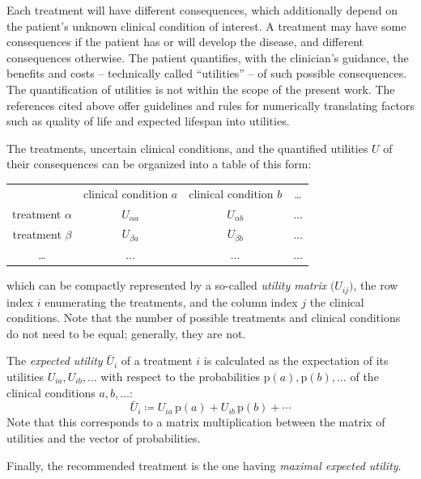 \documentclass[utf8]{FrontiersinHarvard} %
\newcommand*{\pencil}{{\fontencoding{U}\fontfamily{fontawesometwo}\selectfont\symbol{210}}}
\newcommand{\mynotep}[1]{{\color{notecolour}\pencil\ #1}}
\newcommand*{\p}{\mathrm{p}}%
\renewcommand*{\|}[1][]{\nonscript\:#1\vert\nonscript\:\mathopen{}}
\newcommand*{\defd}{\coloneqq}
\newcommand*{\eU}{\bar{U}}
\begin{document}
Each treatment will have different consequences, which additionally depend on the patient's unknown clinical condition of interest. A treatment may have some consequences if the patient has or will develop the disease, and different consequences otherwise. The patient quantifies, with the clinician's guidance, the benefits and costs -- technically called \enquote{utilities} -- of such possible consequences. The quantification of utilities is not within the scope of the present work. The references cited above offer guidelines and rules for numerically translating factors such as quality of life and expected lifespan into utilities.

The treatments, uncertain clinical conditions, and the quantified utilities $U$ of their consequences can be organized into a table of this form:
  \begin{center}
    \begin{tabular}{cccc}
      &{\small clinical condition $a$}&{\small clinical condition $b$}&{\small \ldots}
      \\[2\jot]
      {\small treatment $\alpha$} & $U_{\alpha a}$ & $U_{\alpha b}$ &$\dotso$ \\[\jot]
      {\small treatment $\beta$} & $U_{\beta a}$ & $U_{\beta b}$ &$\dotso$ \\[\jot]
      {\small \ldots} &$\dotso$&$\dotso$&$\dotso$
    \end{tabular}
  \end{center}
which can be compactly represented by a so-called \emph{utility matrix} $\bigl(U_{ij})$, the row index $i$ enumerating the treatments, and the column index $j$ the clinical conditions. Note that the number of possible treatments and clinical conditions do not need to be equal; generally, they are not.

The \emph{expected utility} $\eU_{i}$ of a treatment $i$ is calculated as the expectation of its utilities $U_{ia}, U_{ib}, \dotsc$ with respect to the probabilities $\p(a), \p(b), \dotsc$ of the clinical conditions $a,b,\dotsc$:
\begin{equation}
  \label{eq:def_expected_utility}
  \eU_{i} \defd U_{ia}\, \p(a) + U_{ib}\, \p(b) + \dotsb
\end{equation}
Note that this corresponds to a matrix multiplication between the matrix of utilities and the vector of probabilities.

Finally, the recommended treatment is the one having \emph{maximal expected utility}.

\end{document}
